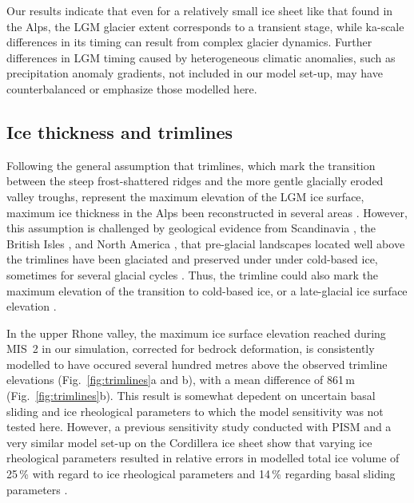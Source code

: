 \documentclass[tc, manuscript]{copernicus}
\begin{document}
    Our results indicate that even for a relatively small ice sheet like that
    found in the Alps, the LGM glacier extent corresponds to a transient
    stage, while ka-scale differences in its timing can
    result from complex glacier dynamics. Further differences in LGM timing
    caused by heterogeneous climatic anomalies, such as precipitation
    anomaly gradients, not included in our model set-up, may have
    counterbalanced or emphasize those modelled here.


\subsection{Ice thickness and trimlines}
\label{sec:thickness}

    Following the general assumption that trimlines, which mark the transition
    between the steep frost-shattered ridges and the more gentle glacially eroded
    valley troughs, represent the maximum elevation of the LGM ice surface,
    maximum ice thickness in the Alps been reconstructed in several areas
    \citep{Husen.1987, Florineth.1998, Florineth.Schluchter.1998,
    Kelly.etal.2004, Bini.etal.2009, Coutterand.2010, Cossart.etal.2012}.
    However, this assumption is challenged by geological evidence from
    Scandinavia \citep[e.g.,][]{Kleman.1994, Kleman.Borgstrom.1994},
    the British Isles \citep[e.g.,][]{Fabel.etal.2012}, and
    North America \citep[e.g.,][]{Kleman.etal.2010}, that pre-glacial landscapes
    located well above the trimlines have been glaciated and preserved under
    under cold-based ice, sometimes for several glacial cycles
    \citep{Stroeven.etal.2002}. Thus, the trimline could also mark the
    maximum elevation of the transition to cold-based ice, or a late-glacial
    ice surface elevation \citep[Fig.~1, p.~403]{Coutterand.2010}.

    In the upper Rhone valley, the maximum ice surface elevation reached
    during MIS~2 in our simulation, corrected for bedrock deformation, is
    consistently modelled to have occured several hundred metres above the
    observed trimline elevations (Fig.~\ref{fig:trimlines}a and b), with a mean
    difference of 861\,m (Fig.~\ref{fig:trimlines}b). This result is
    somewhat depedent on uncertain basal sliding and ice rheological parameters
    to which the model sensitivity was not tested here. However, a previous
    sensitivity study conducted with PISM and a very similar model set-up on
    the Cordillera ice sheet show that varying ice rheological parameters
    resulted in relative errors in modelled total ice volume of 25\,\unit{\%}
    with regard to ice rheological parameters and 14\,\unit{\%} regarding basal
    sliding parameters \citep[Fig.~7]{Seguinot.etal.2016}.
\end{document}

